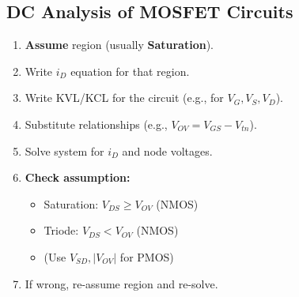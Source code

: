 \documentclass[10pt]{article}
\begin{document}
\begin{multicols*}{2}
\subsection*{DC Analysis of MOSFET Circuits}
\begin{enumerate}\itemsep0pt
    \item \textbf{Assume} region (usually \textbf{Saturation}).
    \item Write $i_D$ equation for that region.
    \item Write KVL/KCL for the circuit (e.g., for $V_G, V_S, V_D$).
    \item Substitute relationships (e.g., $V_{OV} = V_{GS} - V_{tn}$).
    \item Solve system for $i_D$ and node voltages.
    \item \textbf{Check assumption:}
    \begin{itemize}\itemsep0pt
        \item Saturation: $V_{DS} \ge V_{OV}$ (NMOS)
        \item Triode: $V_{DS} < V_{OV}$ (NMOS)
        \item (Use $V_{SD}, |V_{OV}|$ for PMOS)
    \end{itemize}
    \item If wrong, re-assume region and re-solve.
\end{enumerate}

\end{multicols*}
\end{document}

